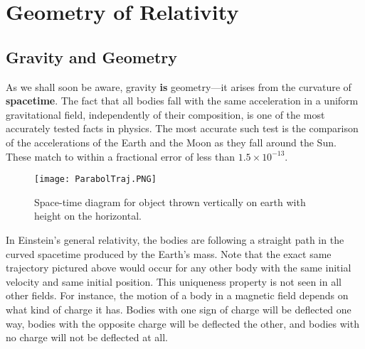 %
%
%
\chapter{Geometry of Relativity}
\label{Geom} %




\section{Gravity and Geometry}
\label{sec:gravGeom}

As we shall soon be aware, gravity \textbf{is} geometry---it arises from the curvature of \textbf{spacetime}. The fact that all bodies fall with the same acceleration in a uniform gravitational field, independently of their composition, is one of the most accurately tested facts in physics. The most accurate such test is the comparison of the accelerations of the Earth and the Moon as they fall around the Sun. These match to within a fractional error of less than $1.5\times 10^{-13}$.

\begin{figure}[H]
    \centering
    \texttt{[image: ParabolTraj.PNG]}
    \caption{Space-time diagram for object thrown vertically on earth with height on the horizontal.}
    \label{fig:parabolTraj}
\end{figure}

In Einstein's general relativity, the bodies are following a straight path in the curved spacetime produced by the Earth's mass. Note that the exact same trajectory pictured above would occur for any other body with the same initial velocity and same initial position. This uniqueness property is not seen in all other fields. For instance, the motion of a body in a magnetic field depends on what kind of charge it has. Bodies with one sign of charge will be deflected one way, bodies with the opposite charge will be deflected the other, and bodies with no charge will not be deflected at all.

